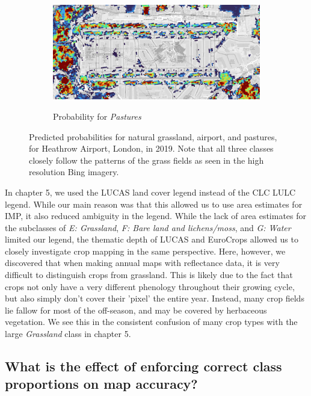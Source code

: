 \begin{figure}[H]
\begin{subfigure}[b]{0.6\textwidth}
            \label{fig:airport_natural_gras}
        \end{subfigure}
        \begin{subfigure}[b]{0.6\textwidth}
            \centering
            \caption{Probability for \textit{Pastures}}
            \includegraphics[width=\textwidth]{figs_06/airport_pastures.png}
            \label{fig:airport_natural_gras}
        \end{subfigure}
        \caption{Predicted probabilities for natural grassland, airport, and pastures, for Heathrow Airport, London, in 2019. Note that all three classes closely follow the patterns of the grass fields as seen in the high resolution Bing imagery.}
        \label{fig:airport_grass}
        \end{figure}

        In chapter 5, we used the LUCAS land cover legend instead of the CLC LULC legend. While our main reason was that this allowed us to use area estimates for IMP, it also reduced ambiguity in the legend. While the lack of area estimates for the subclasses of \textit{E: Grassland}, \textit{F: Bare land and lichens/moss}, and \textit{G: Water} limited our legend, the thematic depth of LUCAS and EuroCrops allowed us to closely investigate crop mapping in the same perspective. Here, however, we discovered that when making annual maps with reflectance data, it is very difficult to distinguish crops from grassland. This is likely due to the fact that crops not only have a very different phenology throughout their growing cycle, but also simply don't cover their 'pixel' the entire year. Instead, many crop fields lie fallow for most of the off-season, and may be covered by herbaceous vegetation. We see this in the consistent confusion of many crop types with the large \textit{Grassland} class in chapter 5.
            
    \subsection{What is the effect of enforcing correct class proportions on map accuracy?}
    \label{syn:rq4}
    
